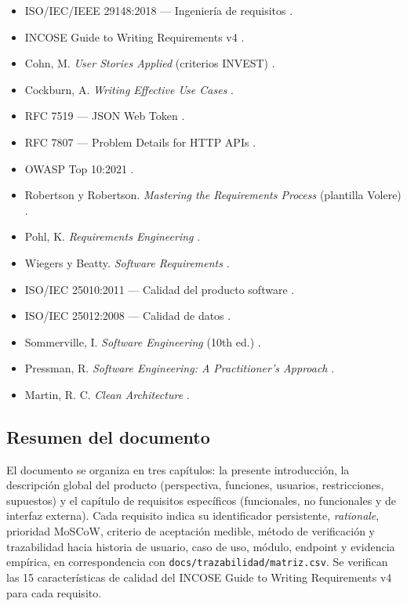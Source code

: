 \documentclass[12pt,a4paper]{article}
\begin{document}
\begin{itemize}
  \item ISO/IEC/IEEE 29148:2018 --- Ingeniería de requisitos \cite{iso29148}.
  \item INCOSE Guide to Writing Requirements v4 \cite{incose}.
  \item Cohn, M. \textit{User Stories Applied} (criterios INVEST) \cite{cohn2004}.
  \item Cockburn, A. \textit{Writing Effective Use Cases} \cite{cockburn2001}.
  \item RFC 7519 --- JSON Web Token \cite{rfc7519}.
  \item RFC 7807 --- Problem Details for HTTP APIs \cite{rfc7807}.
  \item OWASP Top 10:2021 \cite{owasp}.
  \item Robertson y Robertson. \textit{Mastering the Requirements Process} (plantilla Volere) \cite{robertson2012}.
  \item Pohl, K. \textit{Requirements Engineering} \cite{pohl2010}.
  \item Wiegers y Beatty. \textit{Software Requirements} \cite{wiegers2013}.
  \item ISO/IEC 25010:2011 --- Calidad del producto software \cite{iso25010}.
  \item ISO/IEC 25012:2008 --- Calidad de datos \cite{iso25012}.
  \item Sommerville, I. \textit{Software Engineering} (10th ed.) \cite{sommerville2015}.
  \item Pressman, R. \textit{Software Engineering: A Practitioner's Approach} \cite{pressman2014}.
  \item Martin, R. C. \textit{Clean Architecture} \cite{martin2017}.
\end{itemize}

\subsection{Resumen del documento}
\label{sec:resumen}

El documento se organiza en tres capítulos: la presente introducción, la descripción global
del producto (perspectiva, funciones, usuarios, restricciones, supuestos) y el capítulo de
requisitos específicos (funcionales, no funcionales y de interfaz externa). Cada requisito
indica su identificador persistente, \textit{rationale}, prioridad MoSCoW, criterio de
aceptación medible, método de verificación y trazabilidad hacia historia de usuario, caso de
uso, módulo, endpoint y evidencia empírica, en correspondencia con
\texttt{docs/trazabilidad/matriz.csv}. Se verifican las 15 características de calidad del
INCOSE Guide to Writing Requirements v4 \cite{incose} para cada requisito.
\end{document}
